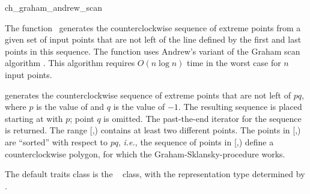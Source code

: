 

\begin{ccRefFunction}{ch_graham_andrew_scan}  %

\ccDefinition
  
The function \ccRefName\ generates the counterclockwise sequence of extreme
points from a given set of input points that are not left of the line defined
by the first and last points in this sequence.  The function uses Andrew's 
variant of the Graham scan algorithm \cite{a-aeach-79} . This algorithm 
requires $O(n \log n)$ time in the worst case for $n$ input points.  


           {generates the counterclockwise sequence of extreme points that are
            not left of $pq$, where $p$ is the value of  and $q$ is
            the value of  $-1$. The resulting sequence is placed
            starting at  with $p$; point $q$ is omitted.  The
            past-the-end iterator for the sequence is returned.
            \ccPrecond %
            The range [,) contains at least
            two different points.
            The points in [,) are ``sorted'' with respect
            to $pq$, {\it i.e.}, the sequence of points in 
            [,) define a counterclockwise polygon, 
            for which the Graham-Sklansky-procedure \cite{s-mcrm-72} works.}

The default traits class  is the \cgal\
 class,%
with the representation type determined by .



\end{ccRefFunction}
